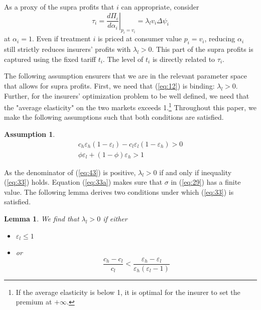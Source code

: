 \documentclass[12pt,english,a4paper]{article}
\newtheorem{assumption}{Assumption}
\newtheorem{lemma}{Lemma}
\begin{document}
As a proxy of the supra profits that \(i\) can appropriate, consider
\begin{equation}
\label{eq:1}
\tau_i = \left. \frac{d\Pi_{\iota}}{d\alpha_{i}} \right|_{p_i=v_i} = \lambda_l v_i \Delta \psi_i
\end{equation}
at \(\alpha_i=1\). Even if treatment \(i\) is priced at consumer value \(p_i = v_i\), reducing \(\alpha_i\) still strictly reduces insurers' profits with \(\lambda_l > 0\). This part of the supra profits is captured using the fixed tariff \(t_i\). The level of \(t_i\) is directly related to \(\tau_i\).

The following assumption ensurers that we are in the relevant parameter space that allows for supra profits. First, we need that (\ref{eq:12}) is binding: \(\lambda_l >0\). Further, for the insurers' optimization problem to be well defined, we need that the "average elasticity" on the two markets exceeds 1.\footnote{If the average elasticity is below 1, it is optimal for the insurer to set the premium at \(+\infty\).} Throughout this paper, we make the following assumptions such that both conditions are satisfied.

\begin{assumption}\label{lem:positiveLambdaL}
\begin{align}
\label{eq:33}
c_h \varepsilon_h (1- \varepsilon_l )-c_l \varepsilon_l(1-\varepsilon_h) > 0 \\
\label{eq:33a}
\phi \varepsilon_l + (1-\phi) \varepsilon_h > 1
\end{align}
\end{assumption}

As the denominator of (\ref{eq:43}) is positive, \(\lambda_l >0\) if and only if inequality (\ref{eq:33}) holds. Equation (\ref{eq:33a}) makes sure that \(\sigma\) in (\ref{eq:29}) has a finite value. The following lemma derives two conditions under which (\ref{eq:33}) is satisfied.

\begin{lemma} \label{lem:conditionElast}
We find that $\lambda_l >0$ if either
\begin{itemize}
\item $\varepsilon_l \leq 1$
\item or
\begin{equation}
\label{eq:34}
\frac{c_h-c_l}{c_l} < \frac{\varepsilon_h - \varepsilon_l}{\varepsilon_h (\varepsilon_l -1)}
\end{equation}
\end{itemize}
\end{lemma}
\end{document}
